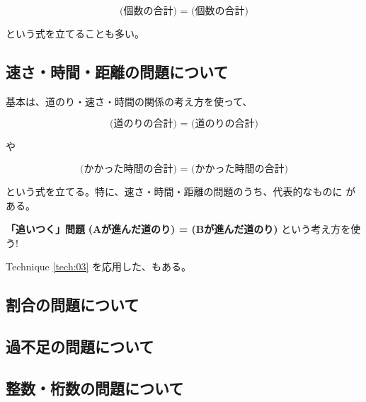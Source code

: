     \[\textbf{(個数の合計) = (個数の合計)}\]

    という式を立てることも多い。

\subsection{速さ・時間・距離の問題について}

    基本は、道のり・速さ・時間の関係の考え方を使って、

    \[\textbf{(道のりの合計) = (道のりの合計)}\]

    や

    \[\textbf{(かかった時間の合計) = (かかった時間の合計)}\]

    という式を立てる。特に、速さ・時間・距離の問題のうち、代表的なものに
    がある。

    \begin{techniquebox}[tech:03]{\textbf{「追いつく」問題}}
        \textbf{(Aが進んだ道のり) = (Bが進んだ道のり)} という考え方を使う!
    \end{techniquebox}

    Technique \ref{tech:03} を応用した、もある。

\subsection{割合の問題について}


\subsection{過不足の問題について}

\subsection{整数・桁数の問題について}
